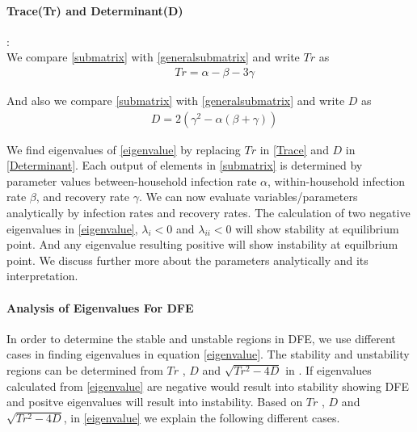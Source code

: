 \documentclass[paper=a4, fontsize=11pt, twoside, BCOR=12mm, parskip=full, listof=totoc]{scrreprt}
\begin{document}
{\paragraph*{Trace(Tr) and Determinant(D)}:\\
We compare \ref{submatrix} with \ref{generalsubmatrix} and write $Tr$ as 
\begin{equation}
\label{Trace} 
\begin{aligned}
&Tr = \alpha - \beta - 3\gamma 
\end{aligned}
\end{equation}

And also we compare \ref{submatrix} with \ref{generalsubmatrix} and  write $D$ as 
\begin{equation}
\label{Determinant}
\begin{aligned}
&D = 2(\gamma^2 - \alpha(\beta + \gamma))
\end{aligned}
\end{equation}

We find eigenvalues of \ref{eigenvalue} by replacing $Tr$ in \ref{Trace} and $D$ in \ref{Determinant}. Each output of elements in \ref{submatrix} is determined by parameter values between-household infection rate $\alpha$, within-household infection rate $\beta$, and recovery rate $\gamma$. We can now evaluate variables/parameters analytically by infection rates and recovery rates. The calculation of two negative eigenvalues in \ref{eigenvalue}, $\lambda_{i} < 0$  and $\lambda_{ii} < 0$ will show stability at equilibrium point. And any eigenvalue resulting positive will show instability at equilbrium point. We discuss further more about the parameters analytically and its interpretation.
\paragraph*{Analysis of Eigenvalues For DFE }
In order to determine the stable and unstable regions in DFE, we use different cases in finding eigenvalues in equation \ref{eigenvalue}. The stability and unstability regions can be determined from $Tr$ , $D$ and $\sqrt{Tr^2-4D}$ in . If eigenvalues calculated from \ref{eigenvalue} are negative would result into stability showing DFE and positve eigenvalues will result into instability.   
Based on $Tr$ , $D$ and $\sqrt{Tr^2-4D} $, in \ref{eigenvalue} we explain the following different cases. 
}
\end{document}
